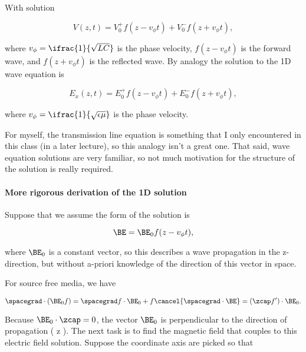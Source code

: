 With solution 

\begin{equation}\label{eqn:uwavesLecture2:280}
V(z, t) = 
V_0^{+} f(z - v_\phi t)
+
V_0^{-} f(z + v_\phi t),
\end{equation}

where \( v_\phi = \ifrac{1}{\sqrt{L C}} \) is the phase velocity, \( f(z - v_\phi t)\) is the forward wave, and \( f(z + v_\phi t) \) is the reflected wave.  By analogy the solution to the 1D wave equation is

\begin{equation}\label{eqn:uwavesLecture2:300}
E_x(z, t) = 
E_0^{+} f(z - v_\phi t)
+
E_0^{-} f(z + v_\phi t),
\end{equation}

where \( v_\phi = \ifrac{1}{\sqrt{\epsilon \mu}} \) is the phase velocity.

For myself, the transmission line equation is something that I only encountered in this class (in a later lecture), so this analogy isn't a great one.  That said, wave equation solutions are very familiar, so not much motivation for the structure of the solution is really required.

\paragraph{More rigorous derivation of the 1D solution}

Suppose that we assume the form of the solution is

\begin{equation}\label{eqn:uwavesLecture2:320}
\BE = \BE_0 f(z - v_\phi t ),
\end{equation}

where \( \BE_0 \) is a constant vector, so this describes a wave propagation in the z-direction, but without a-priori knowledge of the direction of this vector in space.

For source free media, we have

\begin{dmath}\label{eqn:uwavesLecture2:340}
\spacegrad \cdot ( \BE_0 f ) 
= \spacegrad f \cdot \BE_0 + f \cancel{ \spacegrad \cdot \BE }
= (\zcap f') \cdot \BE_0.
\end{dmath}

Because \( \BE_0 \cdot \zcap = 0 \), the vector \( \BE_0 \) is perpendicular to the direction of propagation ( z ).  The next task is to find the magnetic field that couples to this electric field solution.  Suppose the coordinate axis are picked so that 

